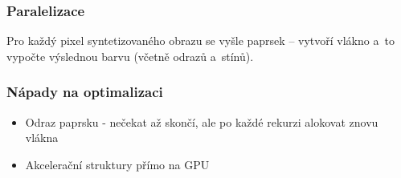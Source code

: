 \documentclass{beamer}
\begin{document}
	
		\begin{frame}[t,fragile]
		\frametitle{Paralelizace}	
				\vspace{15mm}				

\large
Pro každý pixel syntetizovaného obrazu se vyšle paprsek -- vytvoří vlákno a~to vypočte výslednou barvu (včetně odrazů a~stínů).


								
	\end{frame}	
	
	
	\begin{frame}[t,fragile]
		\frametitle{Nápady na optimalizaci}
		\vspace{15mm}
		\begin{itemize}
	    	\item Odraz paprsku - nečekat až skončí, ale po každé rekurzi alokovat znovu vlákna
			\item Akcelerační struktury přímo na GPU
		\end{itemize}					
		
	\end{frame}
	
\end{document}
